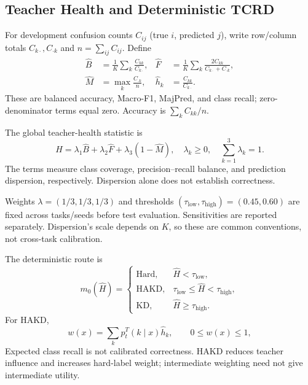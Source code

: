 \documentclass[journal]{IEEEtran}
\theoremstyle{definition}
\theoremstyle{plain}
\begin{document}
\subsection{Teacher Health and Deterministic TCRD}
\label{sec:tcrd}
For development confusion counts $C_{ij}$ (true $i$, predicted $j$), write row/column totals $C_{k\cdot},C_{\cdot k}$ and $n=\sum_{ij}C_{ij}$. Define
\begin{equation}
\begin{aligned}
\widehat B&=\frac1K\sum_k\frac{C_{kk}}{C_{k\cdot}},&
\widehat F&=\frac1K\sum_k\frac{2C_{kk}}{C_{k\cdot}+C_{\cdot k}},\\
\widehat M&=\max_k\frac{C_{\cdot k}}{n},&
\widehat h_k&=\frac{C_{kk}}{C_{k\cdot}}.
\end{aligned}
\label{eq:metrics}
\end{equation}
These are balanced accuracy, Macro-F1, MajPred, and class recall; zero-denominator terms equal zero. Accuracy is $\sum_kC_{kk}/n$.

The global teacher-health statistic is
\begin{equation}
\widehat H=\lambda_1\widehat B+\lambda_2\widehat F+\lambda_3(1-\widehat M),\quad
\lambda_k\ge0,\quad\sum_{k=1}^3\lambda_k=1.
\label{eq:health}
\end{equation}
The terms measure class coverage, precision--recall balance, and prediction dispersion, respectively. Dispersion alone does not establish correctness.

Weights $\lambda=(1/3,1/3,1/3)$ and thresholds $(\tau_{\mathrm{low}},\tau_{\mathrm{high}})=(0.45,0.60)$ are fixed across tasks/seeds before test evaluation. Sensitivities are reported separately. Dispersion's scale depends on $K$, so these are common conventions, not cross-task calibration.

The deterministic route is
\begin{equation}
m_0(\widehat H)=\begin{cases}
\mathrm{Hard},&\widehat H<\tau_{\mathrm{low}},\\
\mathrm{HAKD},&\tau_{\mathrm{low}}\le\widehat H<\tau_{\mathrm{high}},\\
\mathrm{KD},&\widehat H\ge\tau_{\mathrm{high}}.
\end{cases}
\label{eq:threshold}
\end{equation}
For HAKD,
\begin{equation}
w(x)=\sum_kp_t^T(k\mid x)\widehat h_k,\qquad 0\le w(x)\le1,
\label{eq:hakd_weight}
\end{equation}
Expected class recall is not calibrated correctness. HAKD reduces teacher influence and increases hard-label weight; intermediate weighting need not give intermediate utility.
\end{document}
